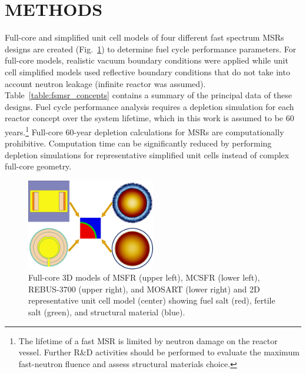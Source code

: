 \documentclass[letterpaper]{mandc2019}
\begin{document}
\section{METHODS}
Full-core and simplified unit cell models of four different fast spectrum \glspl{MSR} designs are created (Fig.~\ref{fig:unit_cell}) to determine fuel cycle performance parameters. 
For full-core models, realistic vacuum boundary conditions were applied  while unit cell simplified models used reflective boundary conditions that  do not take into account neutron leakage (infinite reactor was assumed). 
Table~\ref{table:fsmsr_concepts} contains a summary of the principal data of these designs. 
Fuel cycle performance analysis requires a depletion simulation for each reactor concept over the system lifetime, which in this work is assumed to be 60 years.\footnote{The lifetime of a fast \gls{MSR} is limited by neutron damage on the reactor vessel. 
Further R\&D activities should be performed to evaluate the maximum fast-neutron fluence and assess structural materials choice.} 
Full-core 60-year depletion calculations for \gls{MSR}s are computationally prohibitive. 
Computation time can be significantly reduced by performing depletion simulations for representative simplified unit cells instead of complex full-core geometry.
\begin{figure}[t!]
  \centering
    \vspace{-0.2in}
  \includegraphics[width=0.5\textwidth]{./Figures/fsmsrs.pdf}
  \caption{Full-core 3D models of \gls{MSFR} (upper left), \gls{MCSFR} (lower left), REBUS-3700 (upper right), and \gls{MOSART} (lower right) and 2D representative unit cell model (center) showing fuel salt (red), fertile salt (green), and structural material (blue).}
  \label{fig:unit_cell}
\end{figure}
\end{document}
